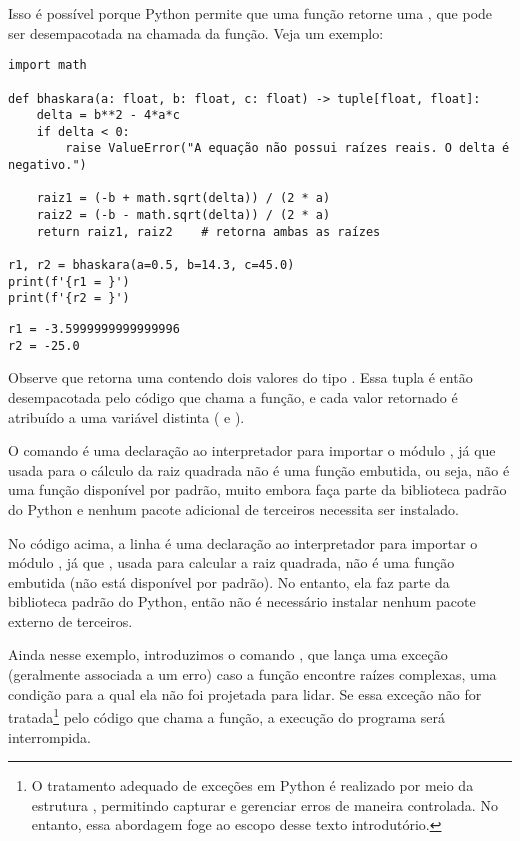 Isso é possível porque Python permite que uma função retorne uma , que pode ser desempacotada na chamada
da função.
Veja um exemplo:
\begin{verbatim}
import math

def bhaskara(a: float, b: float, c: float) -> tuple[float, float]:
    delta = b**2 - 4*a*c
    if delta < 0:
        raise ValueError("A equação não possui raízes reais. O delta é negativo.")

    raiz1 = (-b + math.sqrt(delta)) / (2 * a)
    raiz2 = (-b - math.sqrt(delta)) / (2 * a)
    return raiz1, raiz2    # retorna ambas as raízes

r1, r2 = bhaskara(a=0.5, b=14.3, c=45.0)
print(f'{r1 = }')
print(f'{r2 = }')
\end{verbatim}
\begin{verbatim}
r1 = -3.5999999999999996
r2 = -25.0
\end{verbatim}

Observe que  retorna uma  contendo dois valores do tipo .
Essa tupla é então desempacotada pelo código que chama a função, e cada valor retornado é atribuído a uma
variável distinta ( e ).

O comando  é uma declaração ao interpretador para importar o módulo , já que
 usada para o cálculo da raiz quadrada não é uma função embutida, ou seja, não é uma função disponível
por padrão, muito embora faça parte da biblioteca padrão do Python e nenhum pacote adicional de terceiros
necessita ser instalado.

No código acima, a linha  é uma declaração ao interpretador para importar o módulo ,
já que , usada para calcular a raiz quadrada, não é uma função embutida (não está disponível por padrão).
No entanto, ela faz parte da biblioteca padrão do Python, então não é necessário instalar nenhum pacote externo de terceiros.

Ainda nesse exemplo, introduzimos o comando , que lança uma exceção (geralmente associada a um erro)
caso a função encontre raízes complexas, uma condição para a qual ela não foi projetada para lidar.
Se essa exceção não for tratada\footnote{O tratamento adequado de exceções em Python é realizado por meio da estrutura , permitindo capturar
e gerenciar erros de maneira controlada.
No entanto, essa abordagem foge ao escopo desse texto introdutório.} pelo código que chama a função, a execução do programa será interrompida.





















